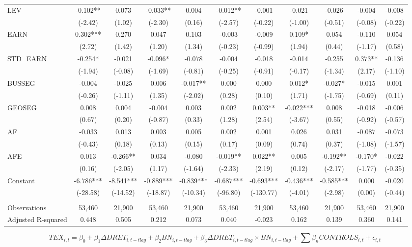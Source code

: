 \begin{table}
\begin{center}
\begin{tabular}{lcccccccccc}
			LEV & -0.102** & 0.073 & -0.033** & 0.004 & -0.012** & -0.001 & -0.021 & -0.026 & -0.004 & -0.008 \\
			& (-2.42) & (1.02) & (-2.30) & (0.16) & (-2.57) & (-0.22) & (-1.00) & (-0.51) & (-0.08) & (-0.22) \\
			EARN & 0.302*** & 0.270 & 0.047 & 0.103 & -0.003 & -0.009 & 0.109* & 0.054 & -0.110 & 0.054 \\
			& (2.72) & (1.42) & (1.20) & (1.34) & (-0.23) & (-0.99) & (1.94) & (0.44) & (-1.17) & (0.58) \\
			STD\_EARN & -0.254* & -0.021 & -0.096* & -0.078 & -0.004 & -0.018 & -0.014 & -0.255 & 0.373** & -0.136 \\
			& (-1.94) & (-0.08) & (-1.69) & (-0.81) & (-0.25) & (-0.91) & (-0.17) & (-1.34) & (2.17) & (-1.10) \\
			BUSSEG & -0.004 & -0.025 & 0.006 & -0.017** & 0.000 & 0.000 & 0.012* & -0.027* & -0.015 & 0.001 \\
			& (-0.26) & (-1.11) & (1.35) & (-2.02) & (0.28) & (0.10) & (1.71) & (-1.75) & (-0.69) & (0.11) \\
			GEOSEG & 0.008 & 0.004 & -0.004 & 0.003 & 0.002 & 0.003** & -0.022*** & 0.008 & -0.018 & -0.006 \\
			& (0.67) & (0.20) & (-0.87) & (0.33) & (1.28) & (2.54) & (-3.67) & (0.55) & (-0.92) & (-0.57) \\
			AF & -0.033 & 0.013 & 0.003 & 0.005 & 0.002 & 0.001 & 0.026 & 0.031 & -0.087 & -0.073 \\
			& (-0.43) & (0.18) & (0.13) & (0.15) & (0.17) & (0.09) & (0.74) & (0.37) & (-1.08) & (-1.57) \\
			AFE & 0.013 & -0.266** & 0.034 & -0.080 & -0.019** & 0.022** & 0.005 & -0.192** & -0.170* & -0.022 \\
			& (0.16) & (-2.05) & (1.17) & (-1.64) & (-2.33) & (2.19) & (0.12) & (-2.17) & (-1.77) & (-0.35) \\
			Constant & -6.786*** & -8.541*** & -0.889*** & -0.839*** & -0.687*** & -0.693*** & -0.436*** & -0.585*** & 0.000 & -0.020 \\
			& (-28.58) & (-14.52) & (-18.87) & (-10.34) & (-96.80) & (-130.77) & (-4.01) & (-2.98) & (0.00) & (-0.44) \\
			&   &   &   &   &   &   &   &   &   &  \\
			Observations & 53,460 & 21,900 & 53,460 & 21,900 & 53,460 & 21,900 & 53,460 & 21,900 & 53,460 & 21,900 \\
			Adjusted R-squared & 0.448 & 0.505 & 0.212 & 0.073 & 0.040 & -0.023 & 0.162 & 0.139 & 0.360 & 0.141 \\
			\bottomrule
			\bottomrule
		\end{tabular}%
	\end{center}
		\begin{footnotesize}
			\setcounter{equation}{0}
			\begin{equation}
				TEX_{i,t}=\beta_0+\beta_1\Delta DRET_{i,t-tlag}+\beta_2BN_{i,t-tlag}+\beta_3\Delta DRET_{i,t-tlag}\times 	BN_{i,t-tlag}+\sum\beta_nCONTROLS_{i,t}+\epsilon_{i,t}
			\end{equation}
			

\end{footnotesize}
\end{table}
